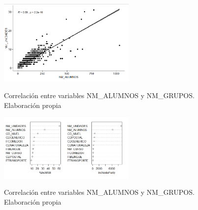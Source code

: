 	\begin{figure}[htb]
	\centering
	\caption{Correlación entre variables NM\_ALUMNOS y NM\_GRUPOS. Elaboración propia}
	\includegraphics[width=0.6\textwidth]{recursos/ImagenesR/RelacionAlumnGrupos}
	\label{fig:relacionAlumnGrup}
\end{figure}
\FloatBarrier


	\begin{figure}[htb]
	\centering
	\caption{Correlación entre variables NM\_ALUMNOS y NM\_GRUPOS. Elaboración propia}
	\includegraphics[width=0.6\textwidth]{recursos/ImagenesR/VarImpRF}
	\label{fig:VarImpRF}
\end{figure}
\FloatBarrier


